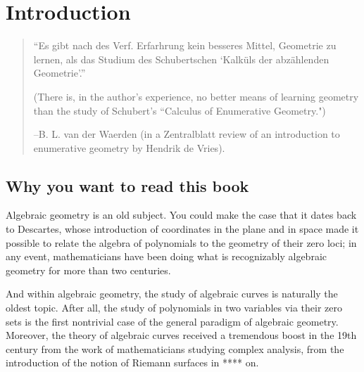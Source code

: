 

\setlength{\parskip}{5pt}

\addtocounter{chapter}{-1}
\chapter{Introduction}
\label{IntroChapter}

\begin{quote}
\small\sf
``Es gibt nach des Verf. Erfarhrung kein besseres Mittel, Geometrie zu lernen, als
das Studium des Schubertschen `Kalk\"uls der abz\"ahlenden Geometrie'.''

(There is, in the author's experience, no better means of learning geometry than
the study of Schubert's ``Calculus of Enumerative Geometry.")

--B. L. van der Waerden (in a Zentralblatt review of an introduction to enumerative geometry
by Hendrik de Vries).
\bigskip

\end{quote}

%


\section{Why you want to read this book}

Algebraic geometry is an old subject. You could make the case that it dates back to Descartes, whose introduction of coordinates in the plane and in space made it possible to relate the algebra of polynomials to the geometry of their zero loci; in any event, mathematicians have been doing what is recognizably algebraic geometry for more than two centuries.

And within algebraic geometry, the study of algebraic curves is naturally the oldest topic. After all, the study of polynomials in two variables via their zero sets is the first nontrivial case of the general paradigm of algebraic geometry. Moreover, the theory of algebraic curves received a tremendous boost in the 19th century from the work of mathematicians studying complex analysis, from the introduction of the notion of Riemann surfaces in **** on.

